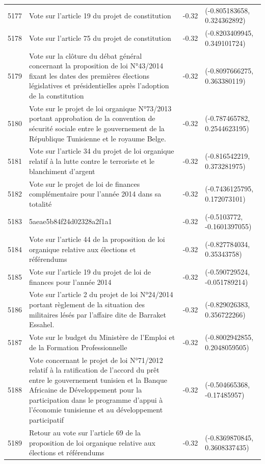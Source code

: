 \begin{table}[ht]
\begin{tabular}{rlrl}
  5177 & Vote sur l'article 19 du projet de constitution & -0.32 & (-0.805183658, 0.324362892) \\ 
  5178 & Vote sur l'article 75 du projet de constitution & -0.32 & (-0.8203409945, 0.349101724) \\ 
  5179 & Vote sur la clôture du débat général concernant la proposition de loi N°43/2014 fixant les dates des premières élections législatives et présidentielles après l'adoption de la constitution & -0.32 & (-0.8097666275, 0.363380119) \\ 
  5180 & Vote sur le projet de loi organique N°73/2013 portant approbation de la convention de sécurité sociale entre le gouvernement de la République Tunisienne et le royaume Belge. & -0.32 & (-0.787465782, 0.2544623195) \\ 
  5181 & Vote sur l'article 34 du projet de loi organique relatif à la lutte contre le terroriste et le blanchiment d'argent & -0.32 & (-0.816542219, 0.373281975) \\ 
  5182 & Vote sur le projet de loi de finances complémentaire pour l'année 2014 dans sa totalité & -0.32 & (-0.7436125795, 0.172073101) \\ 
  5183 & 5aeae5b84f24d02328a2f1a1 & -0.32 & (-0.5103772, -0.1601397055) \\ 
  5184 & Vote sur l'article 44 de la proposition de loi organique relative aux élections et référendums & -0.32 & (-0.827784034, 0.35343758) \\ 
  5185 & Vote sur l'article 19 du projet de loi de finances pour l'année 2014 & -0.32 & (-0.590729524, -0.051789214) \\ 
  5186 & Vote sur l'article 2 du projet de loi N°24/2014 portant règlement de la situation des militaires lésés par l’affaire dite de Barraket Essahel. & -0.32 & (-0.829026383, 0.356722266) \\ 
  5187 & Vote sur le budget du Ministère de l'Emploi et de la Formation Professionnelle & -0.32 & (-0.8002942855, 0.2048059505) \\ 
  5188 & Vote concernant le projet de loi N°71/2012 relatif à la ratification de l'accord du prêt entre le gouvernement tunisien et la Banque Africaine de Développement pour la participation dans le programme d'appui à l'économie tunisienne et au développement participatif & -0.32 & (-0.504665368, -0.17485957) \\ 
  5189 & Retour au vote sur l'article 69 de la proposition de loi organique relative aux élections et référendums & -0.32 & (-0.8369870845, 0.3608337435) \\ 

\end{tabular}
\end{table}
